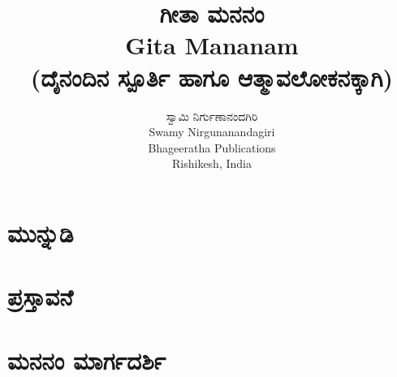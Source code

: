 \documentclass[12pt,twoside,openany]{book}
\title{\Huge \kanfont \textbf{ಗೀತಾ ಮನನಂ}\\
{\normalsize Gita Mananam\\}
{\small(ದೈನಂದಿನ ಸ್ಪೂರ್ತಿ ಹಾಗೂ ಆತ್ಮಾವಲೋಕನಕ್ಕಾಗಿ)}}
\author{\large \kanfont ಸ್ವಾಮಿ ನಿರ್ಗುಣಾನಂದಗಿರಿ\\
{\normalsize Swamy Nirgunanandagiri}\\
\vspace{15mm}
{\normalsize Bhageeratha Publications}\\
{Rishikesh, India}
}
\date{} %
\begin{document}
\sloppy %
%


\thispagestyle{empty}
\frontmatter

\doublespacing
\tableofcontents
\singlespacing

\thispagestyle{empty}
\thispagestyle{empty}
\pagestyle{fancy}

\begin{onehalfspace}
\chapter{\kanfont ಮುನ್ನುಡಿ}

\chapter{\kanfont ಪ್ರಸ್ತಾವನೆ}

\chapter{\kanfont ಮನನಂ ಮಾರ್ಗದರ್ಶಿ}

\end{onehalfspace}
\mainmatter
{}
\makeatletter\@openrightfalse




\printindex
\let\cleardoublepage\clearpage

%
\end{document}
